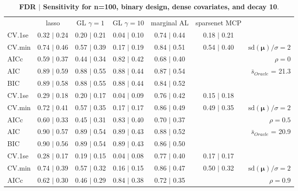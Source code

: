 \clearpage
\begin{table}\vspace{-.5cm}
\caption[l]{ {\it }
{ \bf FDR $\boldsymbol{\mid}$ Sensitivity for n=100, binary design, dense covariates, and  decay  10}.}
\vspace{-.5cm}
\footnotesize{}
\begin{center}
\begin{tabular}{l*{5}{c}|r}
 & lasso & GL $\gamma=1$ & GL $\gamma=10$ & marginal AL & sparsenet MCP  & \\
 \cline{1-7}
CV.1se & 0.32 $\mid$ 0.24 & 0.20 $\mid$ 0.21 & 0.04 $\mid$ 0.10 & 0.74 $\mid$ 0.44 & 0.18 $\mid$ 0.21 & \\
CV.min & 0.74 $\mid$ 0.46 & 0.57 $\mid$ 0.39 & 0.17 $\mid$ 0.19 & 0.84 $\mid$ 0.51 & 0.54 $\mid$ 0.40 &  $\mathrm{sd}(\mathbf{\mu})/\sigma=2$ \\
AICc & 0.59 $\mid$ 0.37 & 0.44 $\mid$ 0.34 & 0.82 $\mid$ 0.42 & 0.68 $\mid$ 0.40 & & $\rho=0$ \\
AIC & 0.89 $\mid$ 0.59 & 0.88 $\mid$ 0.55 & 0.88 $\mid$ 0.44 & 0.87 $\mid$ 0.54 & &  \multirow{2}{*}{$\bar{s}_{Oracle}$ = 21.3} \\
BIC & 0.89 $\mid$ 0.58 & 0.88 $\mid$ 0.55 & 0.88 $\mid$ 0.44 & 0.84 $\mid$ 0.52 & &  \\
 \hline 
CV.1se & 0.29 $\mid$ 0.18 & 0.20 $\mid$ 0.17 & 0.04 $\mid$ 0.09 & 0.76 $\mid$ 0.42 & 0.15 $\mid$ 0.18 & \\
CV.min & 0.72 $\mid$ 0.41 & 0.57 $\mid$ 0.35 & 0.17 $\mid$ 0.17 & 0.86 $\mid$ 0.49 & 0.49 $\mid$ 0.35 &  $\mathrm{sd}(\mathbf{\mu})/\sigma=2$ \\
AICc & 0.60 $\mid$ 0.33 & 0.45 $\mid$ 0.31 & 0.83 $\mid$ 0.40 & 0.70 $\mid$ 0.37 & & $\rho=0.5$ \\
AIC & 0.90 $\mid$ 0.57 & 0.89 $\mid$ 0.54 & 0.89 $\mid$ 0.43 & 0.88 $\mid$ 0.52 & &  \multirow{2}{*}{$\bar{s}_{Oracle}$ = 20.9} \\
BIC & 0.90 $\mid$ 0.56 & 0.89 $\mid$ 0.54 & 0.89 $\mid$ 0.43 & 0.86 $\mid$ 0.50 & &  \\
 \hline 
CV.1se & 0.28 $\mid$ 0.17 & 0.19 $\mid$ 0.15 & 0.04 $\mid$ 0.08 & 0.77 $\mid$ 0.40 & 0.17 $\mid$ 0.17 & \\
CV.min & 0.74 $\mid$ 0.39 & 0.57 $\mid$ 0.32 & 0.16 $\mid$ 0.15 & 0.86 $\mid$ 0.47 & 0.50 $\mid$ 0.32 &  $\mathrm{sd}(\mathbf{\mu})/\sigma=2$ \\
AICc & 0.62 $\mid$ 0.30 & 0.46 $\mid$ 0.29 & 0.84 $\mid$ 0.38 & 0.72 $\mid$ 0.35 & & $\rho=0.9$ \\

\end{tabular}
\end{center}
\end{table}

